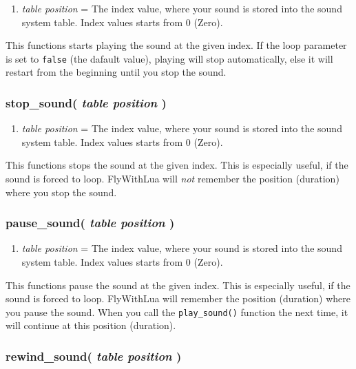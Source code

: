 \documentclass[11pt,parskip=half,a4paper]{scrartcl}
\begin{document}
\begin{enumerate}
	\item \emph{table position} = The index value, where your sound is stored into the sound system table. Index values starts from 0 (Zero).
\end{enumerate}

This functions starts playing the sound at the given index. If the loop parameter is set to \verb|false| (the dafault value), playing will stop automatically, else it will restart from the beginning until you stop the sound.

\subsubsection{ stop\_sound( \emph{table position} )}

\begin{enumerate}
	\item \emph{table position} = The index value, where your sound is stored into the sound system table. Index values starts from 0 (Zero).
\end{enumerate}

This functions stops the sound at the given index. This is especially useful, if the sound is forced to loop. FlyWithLua will \emph{not} remember the position (duration) where you stop the sound.

\subsubsection{ pause\_sound( \emph{table position} )}

\begin{enumerate}
	\item \emph{table position} = The index value, where your sound is stored into the sound system table. Index values starts from 0 (Zero).
\end{enumerate}

This functions pause the sound at the given index. This is especially useful, if the sound is forced to loop. FlyWithLua will remember the position (duration) where you pause the sound. When you call the \verb|play_sound()| function the next time, it will continue at this position (duration).

\subsubsection{ rewind\_sound( \emph{table position} )}
\end{document}
